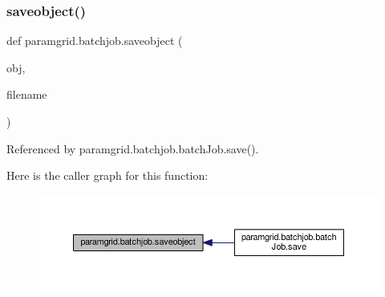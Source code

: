 \subsubsection{\texorpdfstring{saveobject()}{saveobject()}}
{\footnotesize\ttfamily def paramgrid.\+batchjob.\+saveobject (\begin{DoxyParamCaption}\item[{}]{obj,  }\item[{}]{filename }\end{DoxyParamCaption})}



Referenced by paramgrid.\+batchjob.\+batch\+Job.\+save().

Here is the caller graph for this function\+:
\nopagebreak
\begin{figure}[H]
\begin{center}
\leavevmode
\includegraphics[width=350pt]{namespaceparamgrid_1_1batchjob_ab909ba8e3e40ef0f62bd3bff2dc06587_icgraph}
\end{center}
\end{figure}
